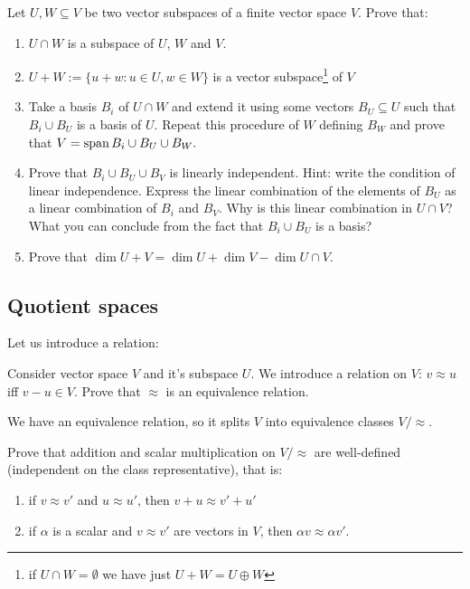 \begin{prob}
  Let $U,W\subseteq V$ be two vector subspaces of a finite vector space $V$. Prove that:
  \begin{enumerate}
    \item $U\cap W$ is a subspace of $U$, $W$ and $V$.
    \item $U+W:=\{u+w : u\in U, w\in W\}$ is a vector subspace\footnote{if $U\cap W=\emptyset$ we have just $U+W=U\oplus W$} of $V$
    \item Take a basis $B_i$ of $U\cap W$ and extend it using some vectors $B_U\subseteq U$ such that $B_i\cup B_U$ is a basis of $U$.
      Repeat this procedure of $W$ defining $B_W$ and prove that $V=\text{span\,} B_i\cup B_U\cup B_W.$
    \item Prove that $B_i\cup B_U\cup B_V$ is linearly independent. Hint: write the condition of linear independence. Express the linear combination of the elements of $B_U$ as a linear combination of $B_i$ and $B_V$. Why is this linear combination in $U\cap V$? What you can conclude from the fact that $B_i\cup B_U$ is a basis?
    \item Prove that $\dim U+V=\dim U+\dim V - \dim U\cap V$.
  \end{enumerate}
\end{prob}

\subsection{Quotient spaces}
Let us introduce a relation:
\begin{prob}
  Consider vector space $V$ and it's subspace $U$. We introduce a relation on $V$: $v\approx u$ iff $v-u\in V$. Prove that $\approx$ is an equivalence relation.
\end{prob}
We have an equivalence relation, so it splits $V$ into equivalence classes $V/\approx$.

\begin{prob}
  Prove that addition and scalar multiplication on $V/\approx$ are well-defined (independent on the class representative), that is:
  \begin{enumerate}
    \item if $v\approx v'$ and $u\approx u'$, then $v+u\approx v'+u'$
    \item if $\alpha$ is a scalar and $v\approx v'$ are vectors in $V$, then $\alpha v\approx \alpha v'$.
  \end{enumerate}
\end{prob}

